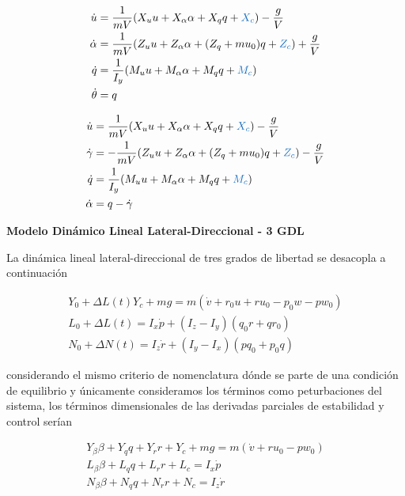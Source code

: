\begin{align}
    \dot u &=\frac{1}{mV}(X_u u + X_\alpha \alpha + X_q q + \textcolor{RoyalBlue}{X_c}) - \frac{g}{V} \\
    \dot \alpha &= \frac{1}{mV}(Z_u u + Z_\alpha \alpha + (Z_q + mu_0) q + \textcolor{RoyalBlue}{Z_c}) + \frac{g}{V} \\
    \dot q &= \frac{1}{I_y}(M_u u + M_\alpha \alpha + M_q q + \textcolor{RoyalBlue}{M_c}) \\  
    \dot \theta &= q
\end{align}

\begin{align}
    \dot u &=\frac{1}{mV}(X_u u + X_\alpha \alpha + X_q q + \textcolor{RoyalBlue}{X_c}) - \frac{g}{V} \\
    \dot \gamma &= -\frac{1}{mV}(Z_u u + Z_\alpha \alpha + (Z_q + mu_0) q + \textcolor{RoyalBlue}{Z_c}) - \frac{g}{V} \\
    \dot q &= \frac{1}{I_y}(M_u u + M_\alpha \alpha + M_q q + \textcolor{RoyalBlue}{M_c}) \\  
    \dot \alpha &= q - \dot \gamma
\end{align}

\textbf{Modelo Dinámico Lineal Lateral-Direccional - 3 GDL}


La dinámica lineal lateral-direccional de tres grados de libertad se desacopla a continuación


\begin{gather}
    Y_0 + \Delta L(t) Y_c + mg = m (\dot v + r_0 u + r u_0 - p_0 w - p w_0) \\
    L_0 + \Delta L(t) = I_x \dot p + (I_z - I_y)(q_0 r + q r_0) \\
    N_0 + \Delta N(t) = I_z \dot r + (I_y - I_x)(p q_0 + p_0 q)
\end{gather}

considerando el mismo criterio de nomenclatura dónde se parte de una condición de equilibrio y únicamente consideramos los términos como peturbaciones del sistema, los términos dimensionales de las derivadas parciales de estabilidad y control serían

\begin{gather}
    Y_\beta \beta + Y_q q + Y_r r + Y_c + mg = m (\dot v + r u_0 - p w_0) \\
    L_\beta \beta + L_q q + L_r r + L_c = I_x \dot p \\
    N_\beta \beta + N_q q + N_r r + N_c = I_z \dot r
\end{gather}

